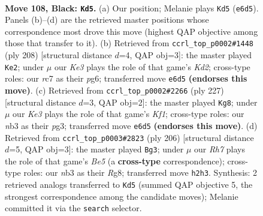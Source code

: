 \documentclass[11pt]{article}
\begin{document}
\clearpage

\begin{figure}[p]\centering
\begin{subfigure}{0.46\textwidth}\centering
\resizebox{\linewidth}{!}{%
\newchessgame
\chessboard[
  setfen={8/2R5/4k3/8/5KP1/1N6/7r/8 b - - 0 108},
  showmover=false,
  pgfstyle=straightmove, color=movearrow, markmove={e6-d5}
]}
\caption{}
\end{subfigure}\hfill
\begin{subfigure}{0.46\textwidth}\centering
\resizebox{\linewidth}{!}{%
\newchessgame
\chessboard[
  setfen={8/6n1/6p1/8/6k1/6p1/3K4/5R2 w - - 12 105},
  showmover=false,
  pgfstyle=straightmove, color=movearrow, markmove={d2-e2}
]}
\caption{}
\end{subfigure}
\\[4pt]
\begin{subfigure}{0.46\textwidth}\centering
\resizebox{\linewidth}{!}{%
\newchessgame
\chessboard[
  setfen={5k2/2R5/r7/6PK/8/6P1/8/8 b - - 24 114},
  showmover=false,
  pgfstyle=straightmove, color=movearrow, markmove={f8-g8}
]}
\caption{}
\end{subfigure}\hfill
\begin{subfigure}{0.46\textwidth}\centering
\resizebox{\linewidth}{!}{%
\newchessgame
\chessboard[
  setfen={6R1/4k3/4p3/4B3/7r/8/4K3/8 w - - 3 104},
  showmover=false,
  pgfstyle=straightmove, color=movearrow, markmove={e5-g3}
]}
\caption{}
\end{subfigure}
\caption{\textbf{Move 108, Black: \texttt{Kd5}.} (a) Our position; Melanie plays \texttt{Kd5} (\texttt{e6d5}). Panels (b)--(d) are the retrieved master positions whose correspondence most drove this move (highest QAP objective among those that transfer to it). (b) Retrieved from \texttt{ccrl\_top\_p0002\#1448} (ply 208) [structural distance $d$=4, QAP obj=3]: the master played \texttt{Ke2}; under $\mu$ our \emph{Ke3} plays the role of that game's \emph{Kd2}; cross-type roles: our \emph{r}c7 as their \emph{p}g6; transferred move \texttt{e6d5} \textbf{(endorses this move)}. (c) Retrieved from \texttt{ccrl\_top\_p0002\#2266} (ply 227) [structural distance $d$=3, QAP obj=2]: the master played \texttt{Kg8}; under $\mu$ our \emph{Ke3} plays the role of that game's \emph{Kf1}; cross-type roles: our \emph{n}b3 as their \emph{p}g3; transferred move \texttt{e6d5} \textbf{(endorses this move)}. (d) Retrieved from \texttt{ccrl\_top\_p0003\#2823} (ply 206) [structural distance $d$=5, QAP obj=3]: the master played \texttt{Bg3}; under $\mu$ our \emph{Rh7} plays the role of that game's \emph{Be5} (a \textbf{cross-type} correspondence); cross-type roles: our \emph{n}b3 as their \emph{R}g8; transferred move \texttt{h2h3}. Synthesis: 2 retrieved analogs transferred to \texttt{Kd5} (summed QAP objective 5, the strongest correspondence among the candidate moves); Melanie committed it via the \texttt{search} selector.}
\label{fig:thought-m215}
\end{figure}
\end{document}
